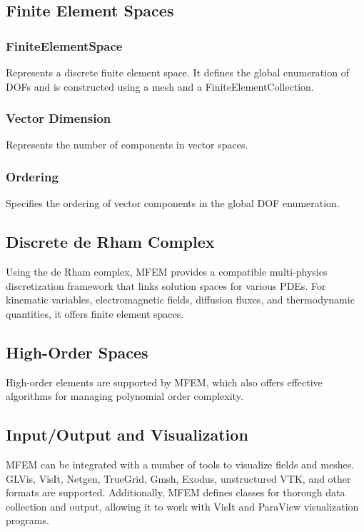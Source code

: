 \documentclass{article}
\begin{document}
\subsection{Finite Element Spaces}
\subsubsection{FiniteElementSpace}
Represents a discrete finite element space. It defines the global enumeration of DOFs and is constructed using a mesh and a FiniteElementCollection.
\subsubsection{Vector Dimension}
Represents the number of components in vector spaces.
\subsubsection{Ordering}
Specifies the ordering of vector components in the global DOF enumeration.
\subsection{Discrete de Rham Complex}
Using the de Rham complex, MFEM provides a compatible multi-physics discretization framework that links solution spaces for various PDEs. For kinematic variables, electromagnetic fields, diffusion fluxes, and thermodynamic quantities, it offers finite element spaces.
\subsection{High-Order Spaces}
High-order elements are supported by MFEM, which also offers effective algorithms for managing polynomial order complexity.
\subsection{Input/Output and Visualization}
MFEM can be integrated with a number of tools to visualize fields and meshes. GLVis, VisIt, Netgen, TrueGrid, Gmsh, Exodus, unstructured VTK, and other formats are supported. Additionally, MFEM defines classes for thorough data collection and output, allowing it to work with VisIt and ParaView visualization programs.
\end{document}
